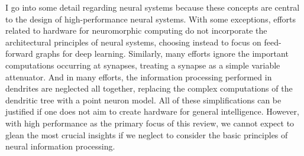 \vspace{3em}
I go into some detail regarding neural systems because these concepts are central to the design of high-performance neural systems. With some exceptions, efforts related to hardware for neuromorphic computing do not incorporate the architectural principles of neural systems, choosing instead to focus on feed-forward graphs for deep learning. Similarly, many efforts ignore the important computations occurring at synapses, treating a synapse as a simple variable attenuator. And in many efforts, the information processing performed in dendrites are neglected all together, replacing the complex computations of the dendritic tree with a point neuron model. All of these simplifications can be justified if one does not aim to create hardware for general intelligence. However, with high performance as the primary focus of this review, we cannot expect to glean the most crucial insights if we neglect to consider the basic principles of neural information processing. 
\begin{figure} 
\end{figure}









